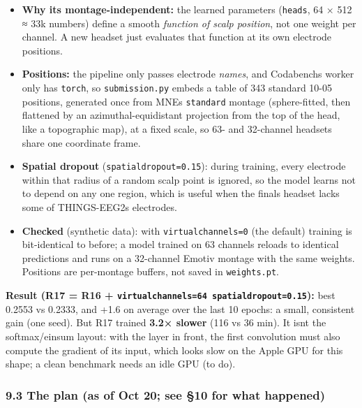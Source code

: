 \documentclass[
  11pt,
]{article}
\providecommand{\tightlist}{%
  \setlength{\itemsep}{0pt}\setlength{\parskip}{0pt}}
\renewcommand{\_}{\oldunderscore\allowbreak}
\begin{document}
\begin{itemize}
\tightlist
\item
  \textbf{Why it\textquotesingle s
  montage-independent:} the learned
  parameters (\texttt{heads}, 64 × 512 ≈
  33k numbers) define a smooth
  \emph{function of scalp position}, not
  one weight per channel. A new headset
  just evaluates that function at its
  own electrode positions.
\item
  \textbf{Positions:} the pipeline only
  passes electrode \emph{names}, and
  Codabench\textquotesingle s worker
  only has \texttt{torch}, so
  \texttt{submission.py} embeds a table
  of 343 standard 10-05 positions,
  generated once from
  MNE\textquotesingle s
  \texttt{standard\_1005} montage
  (sphere-fitted, then flattened by an
  azimuthal-equidistant projection from
  the top of the head, like a
  topographic map), at a fixed scale, so
  63- and 32-channel headsets share one
  coordinate frame.
\item
  \textbf{Spatial dropout}
  (\texttt{spatial\_dropout=0.15}):
  during training, every electrode
  within that radius of a random scalp
  point is ignored, so the model learns
  not to depend on any one region, which
  is useful when the
  final\textquotesingle s headset lacks
  some of THINGS-EEG2\textquotesingle s
  electrodes.
\item
  \textbf{Checked} (synthetic data):
  with \texttt{virtual\_channels=0} (the
  default) training is bit-identical to
  before; a model trained on 63 channels
  reloads to identical predictions and
  runs on a 32-channel Emotiv montage
  with the same weights. Positions are
  per-montage buffers, not saved in
  \texttt{weights.pt}.
\end{itemize}

\textbf{Result (R17 = R16 +
\texttt{virtual\_channels=64\ spatial\_dropout=0.15}):}
best 0.2553 vs 0.2333, and +1.6 on
average over the last 10 epochs: a
small, consistent gain (one seed). But
R17 trained \textbf{3.2× slower} (116 vs
36 min). It isn\textquotesingle t the
softmax/einsum layout: with the layer in
front, the first convolution must also
compute the gradient of its input, which
looks slow on the Apple GPU for this
shape; a clean benchmark needs an idle
GPU (to do).

\subsubsection{9.3 The plan (as of Oct
20; see §10 for what
happened)}\label{the-plan-as-of-oct-20-see-10-for-what-happened}
\end{document}
